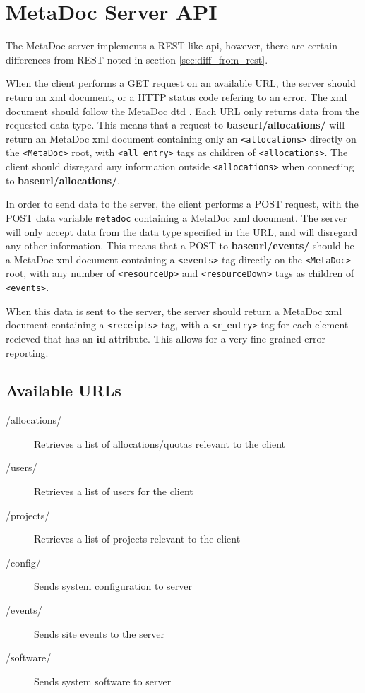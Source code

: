 \newpage
\section{MetaDoc Server API}
\label{sec:server_api}

The MetaDoc server implements a REST-like \gls{api}, however, there are certain
differences from REST noted in section \ref{sec:diff_from_rest}.

When the client performs a GET request on an available URL, the server should
return an \gls{xml} document, or a HTTP status code refering to an error.  The
\gls{xml} document should follow the MetaDoc \gls{dtd} \cite{metadoc_dtd}. Each
URL only returns data from the requested data type. This means that a request
to \textbf{baseurl/allocations/} will return an MetaDoc \gls{xml} document
containing only an \texttt{<allocations>} directly on the \texttt{<MetaDoc>}
root, with \texttt{<all\_entry>} tags as children of \texttt{<allocations>}.
The client should disregard any information outside \texttt{<allocations>} when
connecting to \textbf{baseurl/allocations/}. 

In order to send data to the server, the client performs a POST request, with
the POST data variable \texttt{metadoc} containing a MetaDoc \gls{xml}
document. The server will only accept data from the data type specified in the
URL, and will disregard any other information. This means that a POST to
\textbf{baseurl/events/} should be a MetaDoc \gls{xml} document containing a
\texttt{<events>} tag directly on the \texttt{<MetaDoc>} root, with any number
of \texttt{<resourceUp>} and \texttt{<resourceDown>} tags as children of
\texttt{<events>}. 

When this data is sent to the server, the server should return a MetaDoc
\gls{xml} document containing a \texttt{<receipts>} tag, with a
\texttt{<r\_entry>} tag for each element recieved that has an
\textbf{id}-attribute. This allows for a very fine grained error reporting.

\subsection{Available URLs}

\begin{description}
    \item[/allocations/] Retrieves a list of allocations/quotas relevant
        to the client
    \item[/users/] Retrieves a list of users for the client
    \item[/projects/] Retrieves a list of projects relevant to the
        client
    \item[/config/] Sends system configuration to server
    \item[/events/] Sends site events to the server
    \item[/software/] Sends system software to server
\end{description}

